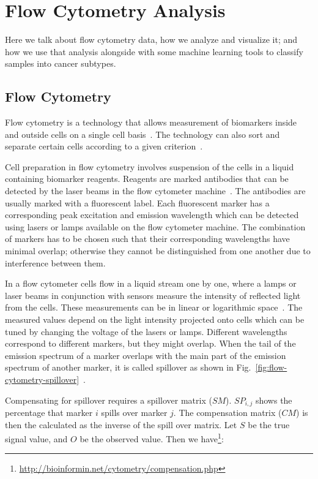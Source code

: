\chapter{Flow Cytometry Analysis}
\label{sec:fcs}

Here we talk about flow cytometry data, how we analyze and visualize it; and how we use that analysis alongside with some machine learning tools to classify samples into cancer subtypes.

\section{Flow Cytometry}
Flow cytometry is a technology that allows measurement of biomarkers inside and outside cells on a single cell basis~\cite{flow-cytometry}. The technology can also sort and separate certain cells according to a given criterion~\cite{flow-cytometry-sorting}.

Cell preparation in flow cytometry involves suspension of the cells in a liquid containing biomarker reagents. Reagents are marked antibodies that can be detected by the laser beams in the flow cytometer machine~\cite{flow-cytometry-cell-preparation}. The antibodies are usually marked with a fluorescent label. Each fluorescent marker has a corresponding peak excitation and emission wavelength which can be detected using lasers or lamps available on the flow cytometer machine. The combination of markers has to be chosen such that their corresponding wavelengths have minimal overlap; otherwise they cannot be distinguished from one another due to interference between them.

In a flow cytometer cells flow in a liquid stream one by one, where a lamps or laser beams in conjunction with sensors measure the intensity of reflected light from the cells. These measurements can be in linear or logarithmic space~\cite{practical-flow-cytometry-book}. The measured values depend on the light intensity projected onto cells which can be tuned by changing the voltage of the lasers or lamps. Different wavelengths correspond to different markers, but they might overlap. When the tail of the emission spectrum of a marker overlaps with the main part of the emission spectrum of another marker, it is called spillover as shown in Fig.~\ref{fig:flow-cytometry-spillover}~\cite{flow-cytometry-compensation}.

Compensating for spillover requires a spillover matrix ($SM$). $SP_{i,j}$ shows the percentage that marker $i$ spills over marker $j$. The compensation matrix ($CM$) is then the calculated as the inverse of the spill over matrix. Let $S$ be the true signal value, and $O$ be the observed value. Then we have\footnote{\url{http://bioinformin.net/cytometry/compensation.php}}:

